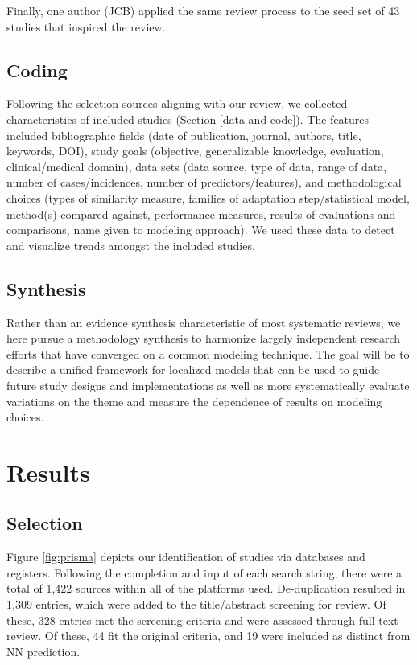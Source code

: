 \documentclass[preprint, 3p,
authoryear]{elsarticle} %
\begin{document}
Finally, one author (JCB) applied the same review process to the seed
set of 43 studies that inspired the review.

\hypertarget{coding}{%
\subsection{Coding}\label{coding}}

Following the selection sources aligning with our review, we collected
characteristics of included studies (Section \ref{data-and-code}). The
features included bibliographic fields (date of publication, journal,
authors, title, keywords, DOI), study goals (objective, generalizable
knowledge, evaluation, clinical/medical domain), data sets (data source,
type of data, range of data, number of cases/incidences, number of
predictors/features), and methodological choices (types of similarity
measure, families of adaptation step/statistical model, method(s)
compared against, performance measures, results of evaluations and
comparisons, name given to modeling approach). We used these data to
detect and visualize trends amongst the included studies.

\hypertarget{synthesis}{%
\subsection{Synthesis}\label{synthesis}}

Rather than an evidence synthesis characteristic of most systematic
reviews, we here pursue a methodology synthesis to harmonize largely
independent research efforts that have converged on a common modeling
technique. The goal will be to describe a unified framework for
localized models that can be used to guide future study designs and
implementations as well as more systematically evaluate variations on
the theme and measure the dependence of results on modeling choices.

\hypertarget{results}{%
\section{Results}\label{results}}

\hypertarget{selection}{%
\subsection{Selection}\label{selection}}

Figure \ref{fig:prisma} depicts our identification of studies via
databases and registers. Following the completion and input of each
search string, there were a total of 1,422 sources within all of the
platforms used. De-duplication resulted in 1,309 entries, which were
added to the title/abstract screening for review. Of these, 328 entries
met the screening criteria and were assessed through full text review.
Of these, 44 fit the original criteria, and 19 were included as distinct
from NN prediction.
\end{document}
